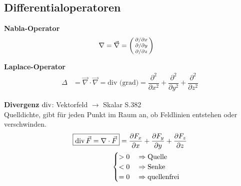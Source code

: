 \subsection{Differentialoperatoren}
\textbf{Nabla-Operator}
\begin{align*}
    \nabla & = \vec{\nabla} = 
    \begin{psmallmatrix}
        \partial  / \partial x \\
        \partial  / \partial y \\
        \partial  / \partial z
    \end{psmallmatrix}
\end{align*}

\textbf{Laplace-Operator}
\begin{align*}
    \varDelta  & = \vec{\nabla} \cdot \vec{\nabla} = \textrm{div (grad)} = 
    \dfrac{\partial ^2}{\partial x^2}+\dfrac{\partial ^2}{\partial y^2}+\dfrac{\partial ^2}{\partial z^2}
\end{align*}

\textbf{Divergenz} $\operatorname{div}$: Vektorfeld $\rightarrow$ Skalar \qquad S.382\\
\small{Quelldichte, gibt für jeden Punkt im Raum an, ob Feldlinien entstehen oder verschwinden.}
\begin{align*}
    \boxed{\operatorname{div} \vec{F} = \nabla \cdot \vec{F}}   =  \dfrac{\partial F_x}{\partial x} 
    + \dfrac{\partial F_y}{\partial y} + \dfrac{\partial F_z}{\partial z}\\ 
                                 \begin{cases}
    > 0 \quad\Rightarrow \textnormal{Quelle}  \\
    < 0 \quad\Rightarrow \textnormal{Senke} \\
    = 0 \quad\Rightarrow \textnormal{quellenfrei} 
\end{cases}                                      
\end{align*}

